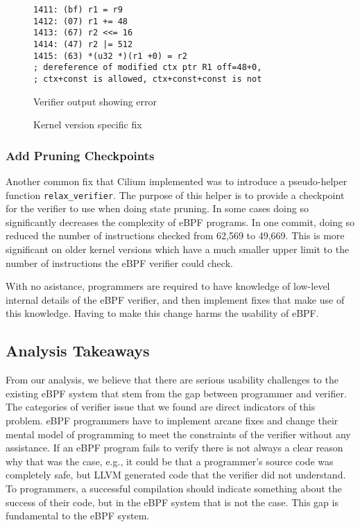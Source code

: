 \begin{figure}
    \begin{lstlisting}[language=myBPF]
1411: (bf) r1 = r9
1412: (07) r1 += 48
1413: (67) r2 <<= 16
1414: (47) r2 |= 512
1415: (63) *(u32 *)(r1 +0) = r2
; dereference of modified ctx ptr R1 off=48+0,
; ctx+const is allowed, ctx+const+const is not
    \end{lstlisting}
    \caption{Verifier output showing error}
    \label{fig:kernel-version}
\end{figure}

\begin{figure}
    
    \caption{Kernel version specific fix}
    \label{fig:kernel-version-code}
\end{figure}

\subsubsection{Add Pruning Checkpoints}
Another common fix that Cilium implemented was to introduce a pseudo-helper function \texttt{relax\_verifier}.
The purpose of this helper is to provide a checkpoint for the verifier to use when doing state pruning.
In some cases doing so significantly decreases the complexity of eBPF programs.
In one commit, doing so reduced the number of instructions checked from 62,569 to 49,669.
This is more significant on older kernel versions which have a much smaller upper limit to the number of instructions the eBPF verifier could check.

With no asistance, programmers are required to have knowledge of low-level
    internal details of the eBPF verifier, and then implement fixes that
    make use of this knowledge.
Having to make this change harms the usability of eBPF.


\subsection{Analysis Takeaways}
From our analysis, we believe that there are serious usability challenges to the
    existing eBPF system that stem from the gap between programmer and verifier.
The categories of verifier issue that we found are direct indicators of this problem.
eBPF programmers have to implement arcane fixes and change their mental model of
    programming to meet the constraints of the verifier without any assistance.
If an eBPF program fails to verify there is not always a clear reason why that was the case, e.g.,
it could be that a programmer's source code was completely safe, but LLVM generated code that the verifier did not understand.
To programmers, a successful compilation should indicate something about the success of their code, but in the eBPF system that is not the case.
This gap is fundamental to the eBPF system.

